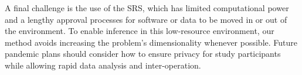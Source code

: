 \documentclass[referee,useAMS,usenatbib]{biom}
\newcommand{\psens}{p_\text{sens}}
\newcommand{\ntot}{n_\text{tot}}
\begin{document}
A final challenge is the use of the SRS, which has limited computational power and a lengthy approval processes for software or data to be moved in or out of the environment.
To enable inference in this low-resource environment, our method avoids increasing the problem's dimensionality whenever possible.
Future pandemic plans should consider how to ensure privacy for study participants while allowing rapid data analysis and inter-operation.


    
    
 


\end{document}
